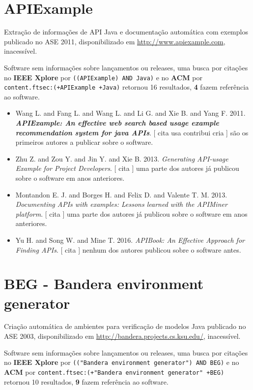 \section{APIExample}

Extração de informações de API Java e documentação automática com exemplos
publicado no ASE 2011,
disponibilizado em \url{http://www.apiexample.com},
inacessível.

Software sem informações sobre lançamentos ou releases,
uma busca por citações no {\bf IEEE Xplore} por
\texttt{((APIExample) AND Java)}
e no {\bf ACM} por
\texttt{content.ftsec:(+APIExample +Java)}
retornou
16 resultados,
{\bf 4} fazem referência ao software.

\begin{itemize}
\item Wang L. and Fang L. and Wang L. and Li G. and Xie B. and Yang F.
      2011.
        \textbf{\textit{ APIExample: An effective web search based usage example recommendation system for java APIs}}.
      [
          cita
          usa
          contribui
          cria
      ]
são os primeiros autores a publicar sobre o software.
\item Zhu Z. and Zou Y. and Jin Y. and Xie B.
      2013.
        \textit{ Generating API-usage Example for Project Developers}.
      [
          cita
      ]
uma parte dos autores já publicou sobre o software em anos anteriores.
\item Montandon E. J. and Borges H. and Felix D. and Valente T. M.
      2013.
        \textit{ Documenting APIs with examples: Lessons learned with the APIMiner platform}.
      [
          cita
      ]
uma parte dos autores já publicou sobre o software em anos anteriores.
\item Yu H. and Song W. and Mine T.
      2016.
        \textit{ APIBook: An Effective Approach for Finding APIs}.
      [
          cita
      ]
nenhum dos autores publicou sobre o software antes.
\end{itemize}
\section{BEG - Bandera environment generator}

Criação automática de ambientes para verificação de modelos Java
publicado no ASE 2003,
disponibilizado em \url{http://bandera.projects.cs.ksu.edu/},
inacessível.

Software sem informações sobre lançamentos ou releases,
uma busca por citações no {\bf IEEE Xplore} por
\texttt{(("Bandera environment generator") AND BEG)}
e no {\bf ACM} por
\texttt{content.ftsec:(+"Bandera environment generator" +BEG)}
retornou
10 resultados,
{\bf 9} fazem referência ao software.

